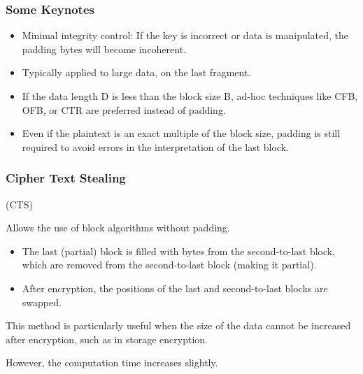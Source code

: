 \subsubsection*{Some Keynotes}
\begin{itemize}
    \item Minimal integrity control: If the key is incorrect or data is manipulated, the padding bytes will become incoherent.
    \item Typically applied to large data, on the last fragment.
    \item If the data length D is less than the block size B, ad-hoc techniques like CFB, OFB, or CTR are preferred instead of padding.
    \item Even if the plaintext is an exact multiple of the block size, padding is still required to avoid errors in the interpretation of the last block.
\end{itemize}

\subsubsection{Cipher Text Stealing}
\begin{center}
    (CTS)
\end{center}
Allows the use of block algorithms without padding.
\begin{itemize}
\item The last (partial) block is filled with bytes from the second-to-last block, which are removed from the second-to-last block (making it partial).
\item After encryption, the positions of the last and second-to-last blocks are swapped.
\end{itemize}
This method is particularly useful when the size of the data cannot be increased after encryption, such as in storage encryption.

However, the computation time increases slightly.

